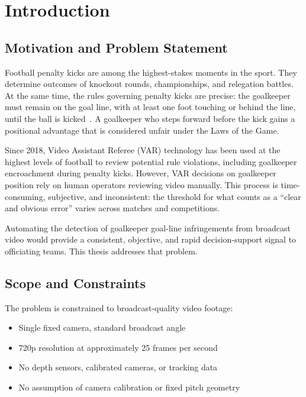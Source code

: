 \documentclass[12pt,a4paper,twoside]{article}
\begin{document}
\section{Introduction}
\label{sec:intro}

\subsection{Motivation and Problem Statement}

Football penalty kicks are among the highest-stakes moments in the sport.
They determine outcomes of knockout rounds, championships, and relegation battles.
At the same time, the rules governing penalty kicks are precise: the goalkeeper
must remain on the goal line, with at least one foot touching or behind the line,
until the ball is kicked~\cite{ifab2024}.
A goalkeeper who steps forward before the kick gains a positional advantage that
is considered unfair under the Laws of the Game.

Since 2018, Video Assistant Referee (VAR) technology has been used at the
highest levels of football to review potential rule violations, including
goalkeeper encroachment during penalty kicks.
However, VAR decisions on goalkeeper position rely on human operators reviewing
video manually. This process is time-consuming, subjective, and inconsistent:
the threshold for what counts as a ``clear and obvious error'' varies across
matches and competitions.

Automating the detection of goalkeeper goal-line infringements from broadcast
video would provide a consistent, objective, and rapid decision-support signal
to officiating teams. This thesis addresses that problem.

\subsection{Scope and Constraints}

The problem is constrained to broadcast-quality video footage:
\begin{itemize}
  \item Single fixed camera, standard broadcast angle
  \item 720p resolution at approximately 25 frames per second
  \item No depth sensors, calibrated cameras, or tracking data
  \item No assumption of camera calibration or fixed pitch geometry
\end{itemize}
\end{document}
